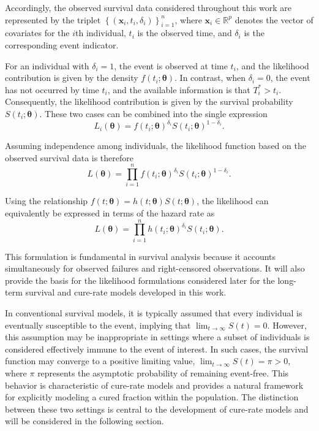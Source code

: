 Accordingly, the observed survival data considered throughout this work are represented
by the triplet $\left\{(\boldsymbol{x}_i,t_i,\delta_i)\right\}_{i=1}^{n}$,
where $\boldsymbol{x}_i\in\mathbb{R}^{p}$ denotes the vector of covariates for the
$i$th individual, $t_i$ is the observed time, and $\delta_i$ is the corresponding event
indicator.

For an individual with $\delta_i=1$, the event is observed at time $t_i$, and the
likelihood contribution is given by the density $f(t_i;\boldsymbol{\theta})$. In
contrast, when $\delta_i=0$, the event has not occurred by time $t_i$, and the available
information is that $T_i^*>t_i$. Consequently, the likelihood contribution is given by
the survival probability $S(t_i;\boldsymbol{\theta})$. These two cases can be combined
into the single expression
\begin{equation}
\label{eq:individual_likelihood}
L_i(\boldsymbol{\theta})
=
f(t_i;\boldsymbol{\theta})^{\delta_i}
S(t_i;\boldsymbol{\theta})^{1-\delta_i}.
\end{equation}

Assuming independence among individuals, the likelihood function based on the observed survival data is therefore
\begin{equation}
\label{eq:observed_likelihood}
L(\boldsymbol{\theta})
=
\prod_{i=1}^{n}
f(t_i;\boldsymbol{\theta})^{\delta_i}
S(t_i;\boldsymbol{\theta})^{1-\delta_i}.
\end{equation}

Using the relationship $f(t;\boldsymbol{\theta})=h(t;\boldsymbol{\theta})S(t;\boldsymbol{\theta})$, the likelihood can equivalently be expressed in terms of the hazard rate as
\begin{equation}
\label{eq:hazard_likelihood}
L(\boldsymbol{\theta})
=
\prod_{i=1}^{n}
h(t_i;\boldsymbol{\theta})^{\delta_i}
S(t_i;\boldsymbol{\theta}).
\end{equation}

This formulation is fundamental in survival analysis because it accounts simultaneously
for observed failures and right-censored observations. It will also provide the basis
for the likelihood formulations considered later for the long-term survival and
cure-rate models developed in this work.

In conventional survival models, it is typically assumed that every individual is
eventually susceptible to the event, implying that $\lim_{t\to\infty}S(t)=0$. However,
this assumption may be inappropriate in settings where a subset of individuals is
considered effectively immune to the event of interest. In such cases, the survival
function may converge to a positive limiting value, $\lim_{t\to\infty}S(t)=\pi>0$, where
$\pi$ represents the asymptotic probability of remaining event-free.
This behavior is characteristic of cure-rate models and provides a natural framework
for explicitly modeling a cured fraction within the population. The distinction between
these two settings is central to the development of cure-rate models and will be
considered in the following section.

